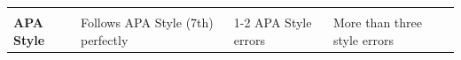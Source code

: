 \documentclass[
  openany]{book}
\begin{document}
\begin{longtable}[]{@{}llll@{}}
\begin{minipage}[t]{0.22\columnwidth}
\end{minipage}\tabularnewline
\begin{minipage}[t]{0.22\columnwidth}\raggedright
\textbf{APA Style}\strut
\end{minipage} & \begin{minipage}[t]{0.22\columnwidth}\raggedright
Follows APA Style (7th) perfectly\strut
\end{minipage} & \begin{minipage}[t]{0.22\columnwidth}\raggedright
1-2 APA Style errors\strut
\end{minipage} & \begin{minipage}[t]{0.22\columnwidth}\raggedright
More than three style errors\strut
\end{minipage}\tabularnewline
\bottomrule
\end{longtable}
\end{document}
